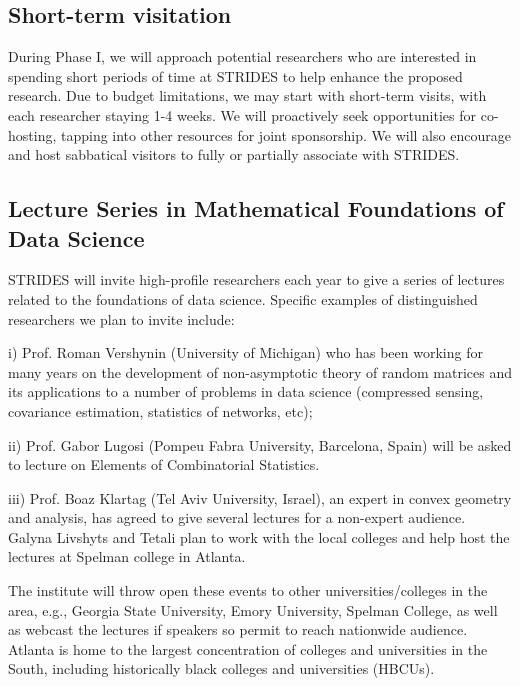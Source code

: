 \documentclass[12pt]{article}
\begin{document}
\vspace*{-1em}

\subsection{Short-term visitation}
\label{sec:short-term}

During Phase I, we will approach potential researchers who are interested in spending short
periods of time at STRIDES to help enhance the proposed research.
Due to budget limitations, we may start with short-term visits, with each researcher staying
1-4 weeks.  We will proactively seek opportunities for co-hosting, tapping into other resources for joint sponsorship. We will also encourage and host sabbatical visitors to
fully or partially associate with STRIDES.


\vspace*{-1em}

\subsection{Lecture Series in Mathematical Foundations of Data Science}
\label{sec:lectures}

STRIDES will invite high-profile researchers each year to give a series of lectures related to the foundations of data science. Specific examples of distinguished researchers we plan to
invite include:

i) Prof. Roman Vershynin (University of Michigan) who has been working for many years on the development of non-asymptotic theory of random matrices and its applications to a number of problems in data science (compressed sensing, covariance estimation, statistics of networks, etc);

ii) Prof. Gabor Lugosi (Pompeu Fabra University, Barcelona, Spain) will be asked to lecture on Elements of Combinatorial Statistics.

iii) Prof. Boaz Klartag (Tel Aviv University, Israel), an expert in convex geometry and analysis, has agreed to give several lectures for a non-expert audience. Galyna Livshyts and Tetali plan to work with the local colleges and help host the lectures at Spelman college in Atlanta.%

The institute will throw open these events to other universities/colleges in the area, e.g., Georgia State University, Emory University, Spelman College, as well as webcast the lectures
if speakers so permit to reach nationwide audience. Atlanta is home to the largest concentration of colleges and universities in the South, including historically black colleges and universities (HBCUs).
\end{document}

